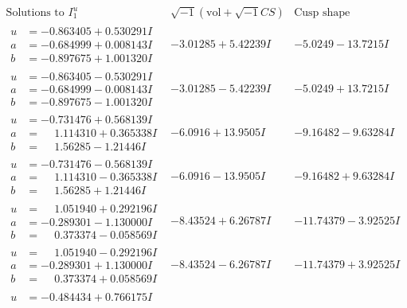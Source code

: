 \documentclass[1p]{elsarticle_modified}
\theoremstyle{definition}
\newcommand{\I}{\sqrt{-1}}
\begin{document}
$$\begin{array}{c|c|c}  
\text{Solutions to }I^u_{1}& \I (\text{vol} + \sqrt{-1}CS) & \text{Cusp shape}\\
 \hline 
\begin{aligned}
u &= -0.863405 + 0.530291 I \\
a &= -0.684999 + 0.008143 I \\
b &= -0.897675 + 1.001320 I\end{aligned}
 & -3.01285 + 5.42239 I & -5.0249 - 13.7215 I \\ \hline\begin{aligned}
u &= -0.863405 - 0.530291 I \\
a &= -0.684999 - 0.008143 I \\
b &= -0.897675 - 1.001320 I\end{aligned}
 & -3.01285 - 5.42239 I & -5.0249 + 13.7215 I \\ \hline\begin{aligned}
u &= -0.731476 + 0.568139 I \\
a &= \phantom{-}1.114310 + 0.365338 I \\
b &= \phantom{-}1.56285 - 1.21446 I\end{aligned}
 & -6.0916 + 13.9505 I & -9.16482 - 9.63284 I \\ \hline\begin{aligned}
u &= -0.731476 - 0.568139 I \\
a &= \phantom{-}1.114310 - 0.365338 I \\
b &= \phantom{-}1.56285 + 1.21446 I\end{aligned}
 & -6.0916 - 13.9505 I & -9.16482 + 9.63284 I \\ \hline\begin{aligned}
u &= \phantom{-}1.051940 + 0.292196 I \\
a &= -0.289301 - 1.130000 I \\
b &= \phantom{-}0.373374 - 0.058569 I\end{aligned}
 & -8.43524 + 6.26787 I & -11.74379 - 3.92525 I \\ \hline\begin{aligned}
u &= \phantom{-}1.051940 - 0.292196 I \\
a &= -0.289301 + 1.130000 I \\
b &= \phantom{-}0.373374 + 0.058569 I\end{aligned}
 & -8.43524 - 6.26787 I & -11.74379 + 3.92525 I \\ \hline\begin{aligned}
u &= -0.484434 + 0.766175 I \\

\end{aligned}
\end{array}$$
\end{document}
